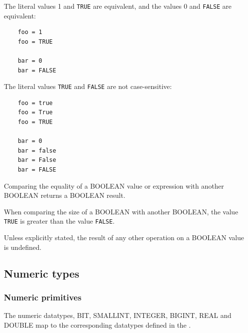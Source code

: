 \documentclass[11pt,a4paper]{ivoa}
\begin{document}
The literal values 1 and \verb:TRUE: are equivalent,
and the values 0 and \verb:FALSE: are equivalent:
\begin{verbatim}
    foo = 1
    foo = TRUE

    bar = 0
    bar = FALSE
\end{verbatim}

The literal values \verb:TRUE: and \verb:FALSE:
are not case-sensitive:
\begin{verbatim}
    foo = true
    foo = True
    foo = TRUE

    bar = 0
    bar = false
    bar = False
    bar = FALSE
\end{verbatim}

Comparing the equality of a BOOLEAN value or expression with another
BOOLEAN returns a BOOLEAN result.

When comparing the size of a BOOLEAN with another BOOLEAN, the value
\verb:TRUE: is greater than the value \verb:FALSE:.

Unless explicitly stated, the result of any other operation on a BOOLEAN
value is undefined.

\subsection{Numeric types}
\label{sec:types.numeric}

\subsubsection{Numeric primitives}
\label{sec:types.numeric.primitive}

The numeric datatypes, BIT, SMALLINT, INTEGER, BIGINT, REAL
and DOUBLE map to the corresponding datatypes defined
in the \VOTableSpec.
\end{document}

